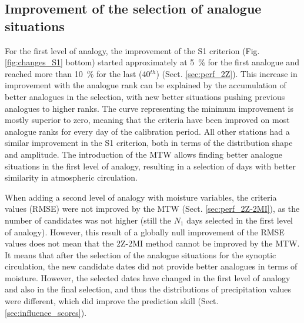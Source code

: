 \documentclass[hess, manuscript]{copernicus}
\begin{document}
	
	
	
	\subsection{Improvement of the selection of analogue situations}
	
	For the first level of analogy, the improvement of the S1 criterion (Fig. \ref{fig:changes_S1} bottom) started approximately at 5~\% for the first analogue and reached more than 10~\% for the last (40$^{th}$) (Sect. \ref{sec:perf_2Z}). This increase in improvement with the analogue rank can be explained by the accumulation of better analogues in the selection, with new better situations pushing previous analogues to higher ranks. The curve representing the minimum improvement is mostly superior to zero, meaning that the criteria have been improved on most analogue ranks for every day of the calibration period. All other stations had a similar improvement in the S1 criterion, both in terms of the distribution shape and amplitude. The introduction of the MTW allows finding better analogue situations in the first level of analogy, resulting in a selection of days with better similarity in atmospheric circulation.
	
	When adding a second level of analogy with moisture variables, the criteria values (RMSE) were not improved by the MTW (Sect. \ref{sec:perf_2Z-2MI}), as the number of candidates was not higher (still the $N_{1}$ days selected in the first level of analogy). However, this result of a globally null improvement of the RMSE values does not mean that the 2Z-2MI method cannot be improved by the MTW. It means that after the selection of the analogue situations for the synoptic circulation, the new candidate dates did not provide better analogues in terms of moisture. However, the selected dates have changed in the first level of analogy and also in the final selection, and thus the distributions of precipitation values were different, which did improve the prediction skill (Sect. \ref{sec:influence_scores}).
	
\end{document}
